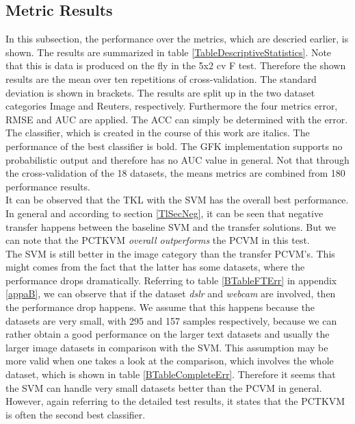 \subsection{Metric Results}\label{EmSubSecMetricResult}
In this subsection, the performance over the metrics, which are descried earlier, is shown.
The results are summarized in table \ref{TableDescriptiveStatistics}. 
Note that this is data is produced on the fly in the 5x2 cv F test. Therefore the shown results are the mean over ten repetitions of cross-validation.
The standard deviation is shown in brackets. 
The results are split up in the two dataset categories Image and Reuters, respectively.
Furthermore the four metrics error, \acs{RMSE} and \acs{AUC} are applied.
The \ac{ACC} can simply be determined with the error.
The classifier, which is created in the course of this work are italics.
The performance of the best classifier is bold.
The \acs{GFK} implementation supports no probabilistic output and therefore has no \acs{AUC} value in general.
Not that through the cross-validation of the 18 datasets, the means metrics are combined from 180 performance results.\\
It can be observed that the \acs{TKL} with the \acs{SVM} has the overall best performance. 
In general and according to section \ref{TlSecNeg}, it can be seen that negative transfer happens between the baseline \acs{SVM} and the transfer solutions.
But we can note that the \acs{PCTKVM}  \textit{overall outperforms} the \acs{PCVM} in this test.\\
The \acs{SVM} is still better in the image category than the transfer \acs{PCVM}'s. 
This might comes from the fact that the latter has some datasets, where the performance drops dramatically.
Referring to table \ref{BTableFTErr} in appendix \ref{appaB}, we can observe that if the dataset \textit{dslr} and \textit{webcam} are involved, then the performance drop happens. 
We assume that this happens because the datasets are very small, with 295 and 157 samples respectively, because we can rather obtain a good performance on the larger text datasets and usually the larger image datasets in comparison with the \acs{SVM}.
This assumption may be more valid when one takes a look at the comparison, which involves the whole dataset, which is shown in table \ref{BTableCompleteErr}.
Therefore it seems that the \acs{SVM} can handle very small datasets better than the \acs{PCVM} in general. However, again referring to the detailed test results, it states that the \acs{PCTKVM} is often the second best classifier.\\

